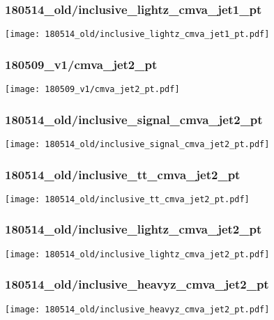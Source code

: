\begin{frame}
   \frametitle{\small 180514\_old/inclusive\_lightz\_cmva\_jet1\_pt}
   \centering
   \texttt{[image: 180514\_old/inclusive\_lightz\_cmva\_jet1\_pt.pdf]}
\end{frame}

\begin{frame}
   \frametitle{\small 180509\_v1/cmva\_jet2\_pt}
   \centering
   \texttt{[image: 180509\_v1/cmva\_jet2\_pt.pdf]}
\end{frame}

\begin{frame}
   \frametitle{\small 180514\_old/inclusive\_signal\_cmva\_jet2\_pt}
   \centering
   \texttt{[image: 180514\_old/inclusive\_signal\_cmva\_jet2\_pt.pdf]}
\end{frame}

\begin{frame}
   \frametitle{\small 180514\_old/inclusive\_tt\_cmva\_jet2\_pt}
   \centering
   \texttt{[image: 180514\_old/inclusive\_tt\_cmva\_jet2\_pt.pdf]}
\end{frame}

\begin{frame}
   \frametitle{\small 180514\_old/inclusive\_lightz\_cmva\_jet2\_pt}
   \centering
   \texttt{[image: 180514\_old/inclusive\_lightz\_cmva\_jet2\_pt.pdf]}
\end{frame}

\begin{frame}
   \frametitle{\small 180514\_old/inclusive\_heavyz\_cmva\_jet2\_pt}
   \centering
   \texttt{[image: 180514\_old/inclusive\_heavyz\_cmva\_jet2\_pt.pdf]}
\end{frame}

